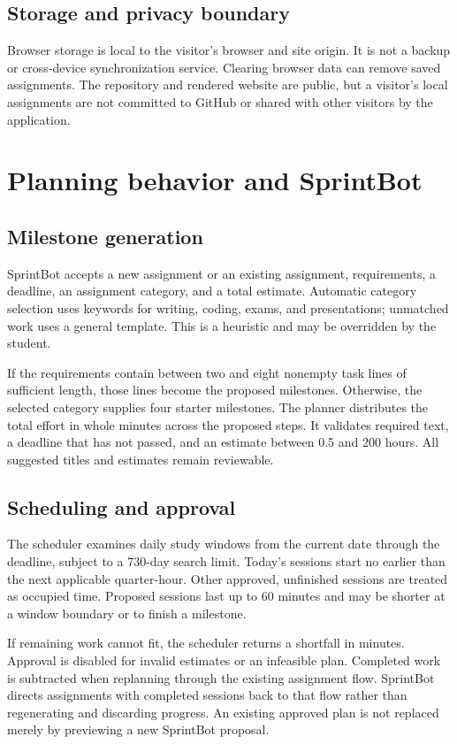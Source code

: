 \documentclass[11pt,letterpaper]{article}
\begin{document}
\subsection{Storage and privacy boundary}
Browser storage is local to the visitor's browser and site origin. It is not a backup or cross-device synchronization service. Clearing browser data can remove saved assignments. The repository and rendered website are public, but a visitor's local assignments are not committed to GitHub or shared with other visitors by the application.

\newpage
\section{Planning behavior and SprintBot}
\subsection{Milestone generation}
SprintBot accepts a new assignment or an existing assignment, requirements, a deadline, an assignment category, and a total estimate. Automatic category selection uses keywords for writing, coding, exams, and presentations; unmatched work uses a general template. This is a heuristic and may be overridden by the student.

If the requirements contain between two and eight nonempty task lines of sufficient length, those lines become the proposed milestones. Otherwise, the selected category supplies four starter milestones. The planner distributes the total effort in whole minutes across the proposed steps. It validates required text, a deadline that has not passed, and an estimate between 0.5 and 200 hours. All suggested titles and estimates remain reviewable.

\subsection{Scheduling and approval}
The scheduler examines daily study windows from the current date through the deadline, subject to a 730-day search limit. Today's sessions start no earlier than the next applicable quarter-hour. Other approved, unfinished sessions are treated as occupied time. Proposed sessions last up to 60 minutes and may be shorter at a window boundary or to finish a milestone.

If remaining work cannot fit, the scheduler returns a shortfall in minutes. Approval is disabled for invalid estimates or an infeasible plan. Completed work is subtracted when replanning through the existing assignment flow. SprintBot directs assignments with completed sessions back to that flow rather than regenerating and discarding progress. An existing approved plan is not replaced merely by previewing a new SprintBot proposal.
\end{document}
